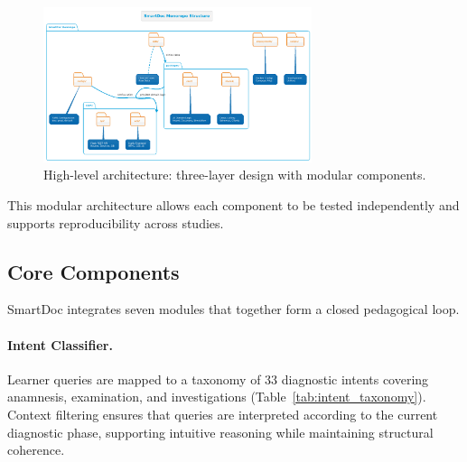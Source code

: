 \begin{figure}[h]
\centering
\includegraphics[width=0.70\textwidth]{figures/diagrams/high-level.png}
\caption{High-level architecture: three-layer design with modular components.}
\label{fig:high-level-arch}
\end{figure}

This modular architecture allows each component to be tested independently and
supports reproducibility across studies.

\subsection{Core Components}

SmartDoc integrates seven modules that together form a closed pedagogical loop.

\paragraph{Intent Classifier.}
Learner queries are mapped to a taxonomy of 33 diagnostic intents covering
anamnesis, examination, and investigations (Table~\ref{tab:intent_taxonomy}).
Context filtering ensures that queries are interpreted according to the current
diagnostic phase, supporting intuitive reasoning while maintaining structural
coherence.

